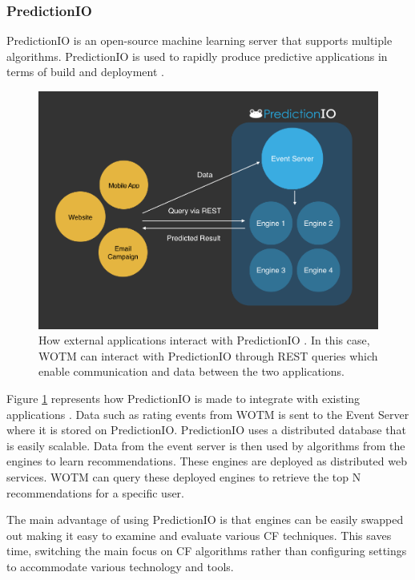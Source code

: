 \subsubsection{PredictionIO}

PredictionIO is an open-source machine learning server that supports multiple algorithms. PredictionIO is used to rapidly produce predictive applications in terms of build and deployment \cite{predictionio, predictionio2}.

\begin{figure}
\centering
\includegraphics[scale=0.35]{images/predictionIO}
\caption{ How external applications interact with PredictionIO \cite{predictionio}. In this case, WOTM can interact with PredictionIO through REST queries which enable communication and data between the two applications.}
\label{fig:predictionIO}
\end{figure}


Figure \ref{fig:predictionIO} represents how PredictionIO is made to integrate with existing applications \cite{predictionio}. Data such as rating events from WOTM is sent to the Event Server where it is stored on PredictionIO. PredictionIO uses a distributed database that is easily scalable. Data from the event server is then used by algorithms from the engines to learn recommendations. These engines are deployed as distributed web services. WOTM can query these deployed engines to retrieve the top N recommendations for a specific user. 

The main advantage of using PredictionIO is that engines can be easily swapped out making it easy to examine and evaluate various CF techniques. This saves time, switching the main focus on CF algorithms rather than configuring settings to accommodate various technology and tools.

